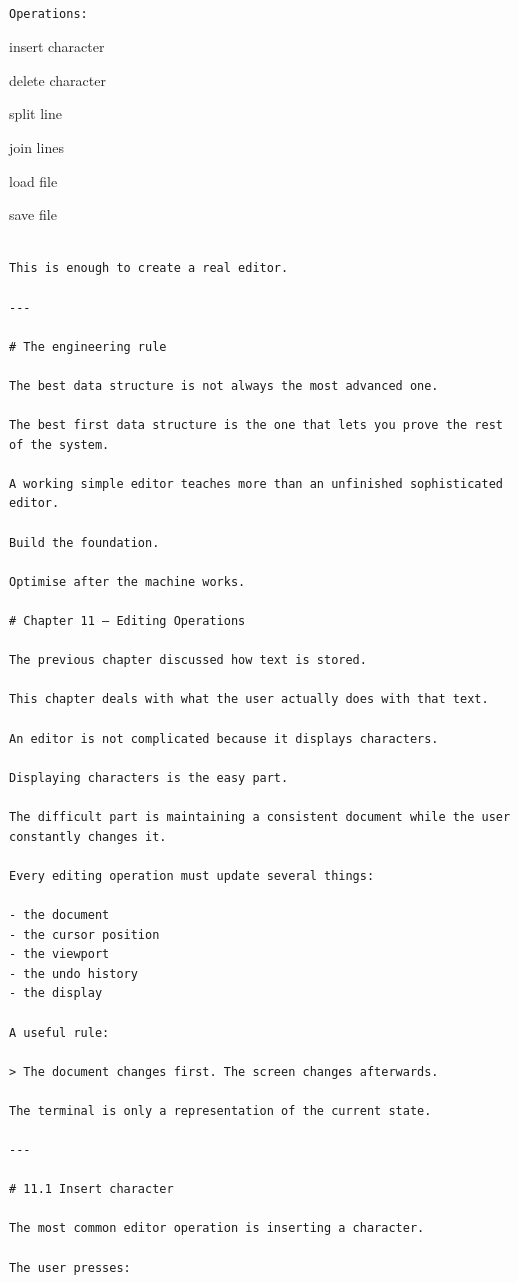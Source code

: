 \documentclass[
  oneside,
  openany]{book}
\begin{document}
\begin{verbatim}

Operations:
\end{verbatim}

insert character

delete character

split line

join lines

load file

save file

\begin{verbatim}

This is enough to create a real editor.

---

# The engineering rule

The best data structure is not always the most advanced one.

The best first data structure is the one that lets you prove the rest of the system.

A working simple editor teaches more than an unfinished sophisticated editor.

Build the foundation.

Optimise after the machine works.

# Chapter 11 — Editing Operations

The previous chapter discussed how text is stored.

This chapter deals with what the user actually does with that text.

An editor is not complicated because it displays characters.

Displaying characters is the easy part.

The difficult part is maintaining a consistent document while the user constantly changes it.

Every editing operation must update several things:

- the document
- the cursor position
- the viewport
- the undo history
- the display

A useful rule:

> The document changes first. The screen changes afterwards.

The terminal is only a representation of the current state.

---

# 11.1 Insert character

The most common editor operation is inserting a character.

The user presses:
\end{verbatim}
\end{document}
